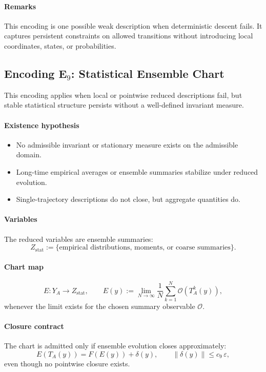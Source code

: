 \documentclass[11pt]{article}
\theoremstyle{plain}
\theoremstyle{plain}
\begin{document}
\paragraph{Remarks}
This encoding is one possible weak description when deterministic descent
fails.  It captures persistent constraints on
allowed transitions without introducing local coordinates, states,
or probabilities.
\subsection{Encoding \texorpdfstring{E$_9$}{E9}: Statistical Ensemble Chart}

This encoding applies when local or pointwise reduced descriptions fail,
but stable statistical structure persists without a well-defined
invariant measure.

\paragraph{Existence hypothesis}
\begin{itemize}
\item No admissible invariant or stationary measure exists on the
      admissible domain.
\item Long-time empirical averages or ensemble summaries stabilize
      under reduced evolution.
\item Single-trajectory descriptions do not close, but aggregate
      quantities do.
\end{itemize}

\paragraph{Variables}
The reduced variables are ensemble summaries:
\[
Z_{\mathrm{stat}} := \{\text{empirical distributions, moments, or coarse summaries}\}.
\]

\paragraph{Chart map}
\[
E : Y_A \to Z_{\mathrm{stat}},
\qquad
E(y) := \lim_{N\to\infty} \frac{1}{N}\sum_{k=1}^N \mathcal{O}(T_A^k(y)),
\]
whenever the limit exists for the chosen summary observable $\mathcal{O}$.

\paragraph{Closure contract}
The chart is admitted only if ensemble evolution closes approximately:
\[
E(T_A(y)) = F(E(y)) + \delta(y),
\qquad \|\delta(y)\|\le c_9\,\varepsilon,
\]
even though no pointwise closure exists.
\end{document}
